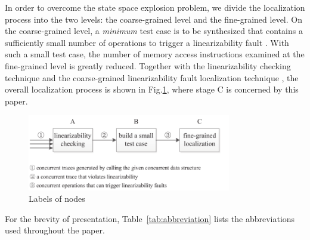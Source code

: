\documentclass[runningheads]{llncs}
\begin{document}
In order to overcome the state space explosion problem, we divide the localization process into the two levels: the coarse-grained level and the fine-grained level.  On the coarse-grained level, a \textit{minimum} test case is to be synthesized that contains a sufficiently small number of operations to trigger a linearizability fault  \cite{DBLP:conf/seke/ZhangWZ17}. 
With such a small test case, the number of memory access instructions examined at the fine-grained level is greatly reduced.
Together with the linearizability checking technique \cite{DBLP:journals/concurrency/Lowe17} and the coarse-grained linearizability fault localization technique \cite{DBLP:conf/seke/ZhangWZ17}, the overall localization process is shown in Fig.\ref{fig:liucheng}, where stage C is concerned by this paper.
\begin{figure}[ht]
\centering
\includegraphics[width = 3.5in]{liucheng.pdf}
\caption{Labels of nodes}\label{fig:liucheng}
\end{figure}

For the brevity of presentation, Table~\ref{tab:abbreviation} lists the abbreviations used throughout the paper.
\begin{table}[]
\centering
\caption{Abbreviations}
\label{tab:abbreviation}
\end{table}
\end{document}
